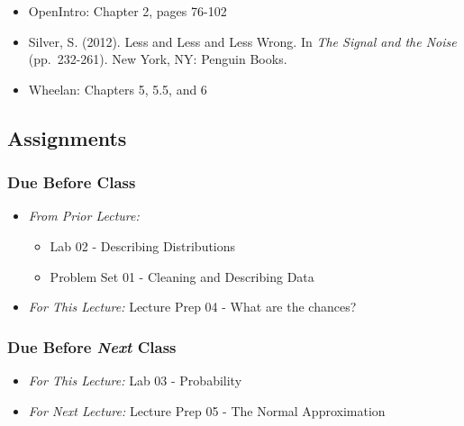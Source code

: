 \documentclass[]{book}
\providecommand{\tightlist}{%
  \setlength{\itemsep}{0pt}\setlength{\parskip}{0pt}}
\theoremstyle{definition}
\theoremstyle{definition}
\theoremstyle{definition}
\theoremstyle{remark}
\begin{document}
\begin{itemize}
\tightlist
\item
  OpenIntro: Chapter 2, pages 76-102
\item
  Silver, S. (2012). Less and Less and Less Wrong. In \emph{The Signal
  and the Noise} (pp.~232-261). New York, NY: Penguin Books.
\item
  Wheelan: Chapters 5, 5.5, and 6
\end{itemize}

\hypertarget{assignments-5}{%
\subsection*{Assignments}\label{assignments-5}}

\hypertarget{due-before-class-3}{%
\subsubsection*{Due Before Class}\label{due-before-class-3}}

\begin{itemize}
\tightlist
\item
  \emph{From Prior Lecture:}

  \begin{itemize}
  \tightlist
  \item
    Lab 02 - Describing Distributions
  \item
    Problem Set 01 - Cleaning and Describing Data
  \end{itemize}
\item
  \emph{For This Lecture:} Lecture Prep 04 - What are the chances?
\end{itemize}

\hypertarget{due-before-next-class-4}{%
\subsubsection*{\texorpdfstring{Due Before \emph{Next}
Class}{Due Before Next Class}}\label{due-before-next-class-4}}

\begin{itemize}
\tightlist
\item
  \emph{For This Lecture:} Lab 03 - Probability
\item
  \emph{For Next Lecture:} Lecture Prep 05 - The Normal Approximation
\end{itemize}
\end{document}
